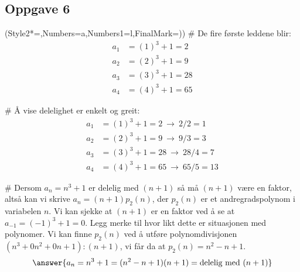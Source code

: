 \subsection*{Oppgave 6}
\begin{easylist}[enumerate]
	\ListProperties(Style2*=,Numbers=a,Numbers1=l,FinalMark={)})
	# De fire første leddene blir:
	\begin{align*}
		a_1 &= (1)^3 + 1 = 2   \\
		a_2 &= (2)^3 + 1 = 9   \\
		a_3 &= (3)^3 + 1 = 28   \\
		a_4 &= (4)^3 + 1 = 65   
	\end{align*}
	
	# Å vise delelighet er enkelt og greit:
	\begin{align*}
	a_1 &= (1)^3 + 1 =2 \ \rightarrow \ 2 / 2 =1  \\
	a_2 &= (2)^3 + 1 =9 \ \rightarrow \ 9  / 3 = 3 \\
	a_3 &= (3)^3 + 1 =28 \ \rightarrow \ 28  / 4 = 7 \\
	a_4 &= (4)^3 + 1 =65 \ \rightarrow \ 65   / 5 = 13
	\end{align*}
	
	# Dersom $a_n = n^3 + 1$ er delelig med $(n+1)$ så må $(n+1)$ være en faktor,
	altså kan vi skrive $a_n = (n+1) p_2(n)$, der $p_2(n)$ er et andregradspolynom i variabelen $n$.
	Vi kan sjekke at $(n+1)$ er en faktor ved å se at $a_{-1} = (-1)^3 + 1 = 0$.
	Legg merke til hvor likt dette er situasjonen med polynomer.
	Vi kan finne $p_2(n)$ ved å utføre polynomdivisjonen $(n^3  + 0n^2 + 0n+ 1):(n+1)$, vi får da at $p_2(n) = n^2 -n + 1$.
	\begin{equation*}
		\answer{a_n = n^3 + 1 = (n^2 -n + 1)(n+1) = \text{delelig med }(n+1)}
	\end{equation*}
\end{easylist}

